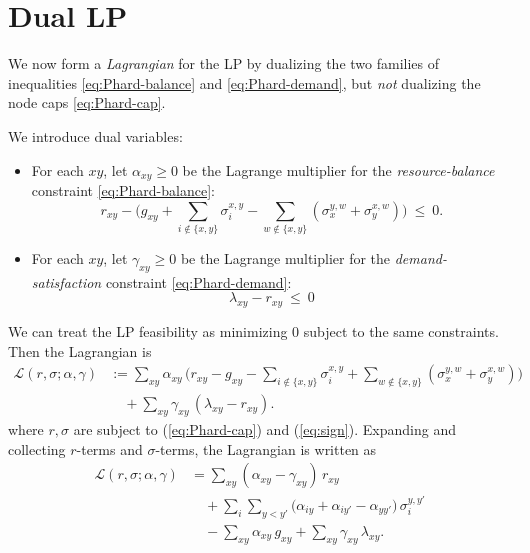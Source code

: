 \documentclass[11pt]{article}
\begin{document}
\section{Dual LP}

We now form a \emph{Lagrangian} for the LP by dualizing the two families of inequalities \eqref{eq:Phard-balance} and \eqref{eq:Phard-demand}, but \emph{not} dualizing the node caps \eqref{eq:Phard-cap}.


We introduce dual variables:
\begin{itemize}[leftmargin=2em]
\item For each $xy$, let $\alpha_{xy}\ge 0$ be the Lagrange multiplier for the \emph{resource-balance} constraint \eqref{eq:Phard-balance}:
\[
r_{xy}
-
\Big(
g_{xy}
+\sum_{i\notin\{x,y\}}\sigma_i^{x,y}
-\sum_{w\notin\{x,y\}}(\sigma_x^{y,w}+\sigma_y^{x,w})
\Big)
\ \le\ 0.
\]

\item For each $xy$, let $\gamma_{xy}\ge 0$ be the Lagrange multiplier for the \emph{demand-satisfaction} constraint \eqref{eq:Phard-demand}:
\[
\lambda_{xy}-r_{xy} \ \le\ 0
\]
\end{itemize}

We can treat the LP feasibility as minimizing $0$ subject to the same constraints. Then the Lagrangian is
\begin{equation}
\begin{aligned}
\mathcal{L}(r,\sigma;\alpha,\gamma)
&:= \sum_{xy}\alpha_{xy}\,
\Big(
r_{xy}
-
g_{xy}
-\sum_{i\notin\{x,y\}}\sigma_i^{x,y}
+\sum_{w\notin\{x,y\}}(\sigma_x^{y,w}+\sigma_y^{x,w})
\Big) \\
&\quad
+ \sum_{xy}\gamma_{xy}\,(\lambda_{xy}-r_{xy}).
\end{aligned}
\label{eq:Lagrangian-expand}
\end{equation}
where $r, \sigma$ are subject to (\ref{eq:Phard-cap}) and (\ref{eq:sign}). Expanding and collecting $r$-terms and $\sigma$-terms, the Lagrangian is written as
\begin{equation}
\begin{aligned}
\mathcal{L}(r,\sigma;\alpha,\gamma)
&= \sum_{xy}(\alpha_{xy}-\gamma_{xy})\,r_{xy} \\
&\quad
+ \sum_i \sum_{y<y'} 
\Big(
\alpha_{iy}+\alpha_{iy'}
-\alpha_{yy'}
\Big)\,
\sigma_i^{y,y'} \\
&\quad
-\sum_{xy} \alpha_{xy}\,g_{xy}
+ \sum_{xy}\gamma_{xy}\,\lambda_{xy}.
\end{aligned}
\label{eq:Lagrangian-collected}
\end{equation}
\end{document}
